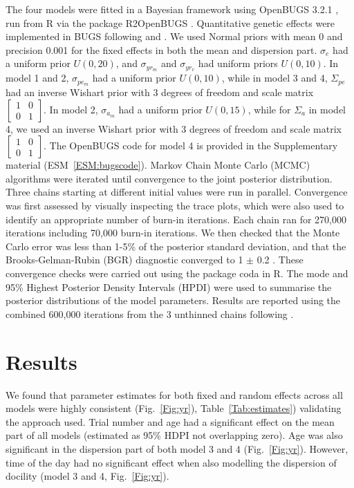 \documentclass[a4paper,12pt,twoside]{article}
\begin{document}
	
	The four models were fitted in a Bayesian framework using OpenBUGS 3.2.1 \citep{thomas_making_2006}, run from R \citep{rdevelopmentcoreteam_r_2014} via the package R2OpenBUGS \cite{sturtz_r2winbugs_2005}. Quantitative genetic effects were implemented in BUGS following \cite{waldmann_easy_2009} and \cite{gorjanc_flexible_2010}.
	We used Normal priors with mean 0 and precision 0.001 for the fixed effects in both the mean and dispersion part.
	$\sigma_e$ had a uniform prior $U(0,20)$, and $\sigma_{yr_m}$ and $\sigma_{yr_v}$ had uniform priors $U(0,10)$.
	In model 1 and 2, $\sigma_{pe_m}$ had a uniform prior $U(0,10)$, while in model 3 and 4, $\Sigma_{pe}$ had an inverse Wishart prior with 3 degrees of freedom and scale matrix $\begin{bmatrix} 1 & 0 \\ 0 & 1 \end{bmatrix}$.
	In model 2, $\sigma_{a_m}$ had a uniform prior $U(0,15)$, while for $\Sigma_{a}$ in model 4, we used an inverse Wishart prior with 3 degrees of freedom and scale matrix $\begin{bmatrix} 1 & 0 \\ 0 & 1 \end{bmatrix}$.
	The OpenBUGS code for model 4 is provided in the Supplementary material (ESM~\ref{ESM:bugscode}).
	Markov Chain Monte Carlo (MCMC) algorithms were iterated until convergence to the joint posterior distribution.
	Three chains starting at different initial values were run in parallel.
	Convergence was first assessed by visually inspecting the trace plots, which were also used to identify an appropriate number of burn-in iterations. 
	Each chain ran for 270,000 iterations including 70,000 burn-in iterations.
	We then checked that the Monte Carlo error was less than 1-5\% of the posterior standard deviation, and that the Brooks-Gelman-Rubin (BGR) diagnostic converged to 1 $\pm$ 0.2 \cite{gilks_markov_1995}.
	These convergence checks were carried out using the package coda \citep{plummer_coda_2006} in R.
	The mode and 95\% Highest Posterior Density Intervals (HPDI) were used to summarise the posterior distributions of the model parameters. 
	Results are reported using the combined 600,000 iterations from the 3 unthinned chains following \citep{link_thinning_2012,kruschke_doing_2014}.
	
	\section*{Results}
	We found that parameter estimates for both fixed and random effects across all models were highly consistent (Fig.~\ref{Fig:yr}), Table~\ref{Tab:estimates}) validating the approach used.
	Trial number and age had a significant effect on the mean part of all models (estimated as 95\% HDPI not overlapping zero). Age was also significant in the dispersion part of both model 3 and 4 (Fig.~\ref{Fig:yr}).
	However, time of the day had no significant effect when also modelling the dispersion of docility (model 3 and 4, Fig.~\ref{Fig:yr}).
	
\end{document}
